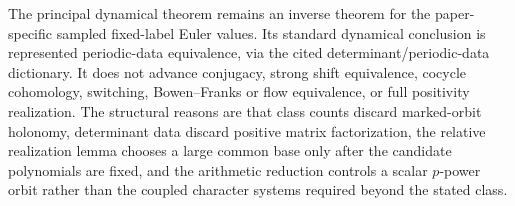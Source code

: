 The principal dynamical theorem remains an inverse theorem for the
paper-specific sampled fixed-label Euler values.  Its standard dynamical
conclusion is represented periodic-data equivalence, via the cited
determinant/periodic-data dictionary.  It does not advance conjugacy, strong
shift equivalence, cocycle cohomology, switching, Bowen--Franks or flow
equivalence, or full positivity realization.  The structural reasons are
that class counts discard marked-orbit holonomy, determinant data discard
positive matrix factorization, the relative realization lemma chooses a
large common base only after the candidate polynomials are fixed, and the
arithmetic reduction controls a scalar \(p\)-power orbit rather than the
coupled character systems required beyond the stated class.
